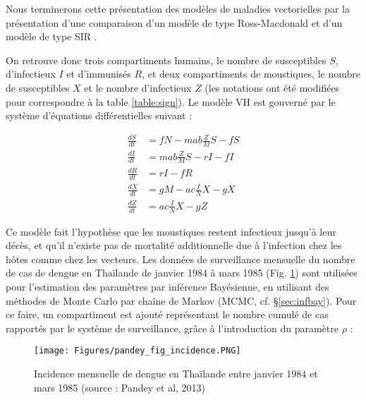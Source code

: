 Nous terminerons cette présentation des modèles de maladies vectorielles par la présentation d'une comparaison d'un modèle de type Ross-Macdonald et d'un modèle de type SIR \cite{pandey2013comparing}. 


On retrouve donc trois compartiments humains, le nombre de susceptibles $S$, d'infectieux $I$ et d'immunisés $R$, et deux compartiments de moustiques, le nombre de susceptibles $X$ et le nombre d'infectieux $Z$ (les notations ont été modifiées pour correspondre à la table \ref{table:sign}). 
Le modèle VH est gouverné par le système d'équations différentielles suivant :

\begin{align}
\frac{dS}{dt} &= fN - mab\frac{Z}{M}S - fS \\ \nonumber
\frac{dI}{dt} &= mab\frac{Z}{M}S - rI - fI \\ \nonumber
\frac{dR}{dt} &= rI - fR \\  \nonumber
\frac{dX}{dt} &= gM - ac\frac{I}{N}X - gX \\ \nonumber
\frac{dZ}{dt} &= ac\frac{I}{N}X - gZ
\end{align}

\noindent Ce modèle fait l'hypothèse que les moustiques restent infectieux jusqu'à leur décès, et qu'il n'existe pas de mortalité additionnelle due à l'infection chez les hôtes comme chez les vecteurs.
Les données de surveillance mensuelle du nombre de cas de dengue en Thaïlande de janvier 1984 à mars 1985 (Fig. \ref{fig:pandey_figure_incidence}) sont utilisées pour l'estimation des paramètres par inférence Bayésienne, en utilisant des méthodes de Monte Carlo par chaîne de Markov (MCMC, cf. \S \ref{sec:infbay}).
Pour ce faire, un compartiment est ajouté représentant le nombre cumulé de cas rapportés par le système de surveillance, grâce à l'introduction du paramètre $\rho$ :



\begin{figure}[t]
	\centering
	\texttt{[image: Figures/pandey\_fig\_incidence.PNG]}
	\caption{Incidence mensuelle de dengue en Thaïlande entre janvier 1984 et mars 1985 (source : Pandey et al, 2013)}
	\label{fig:pandey_figure_incidence}
\end{figure}


